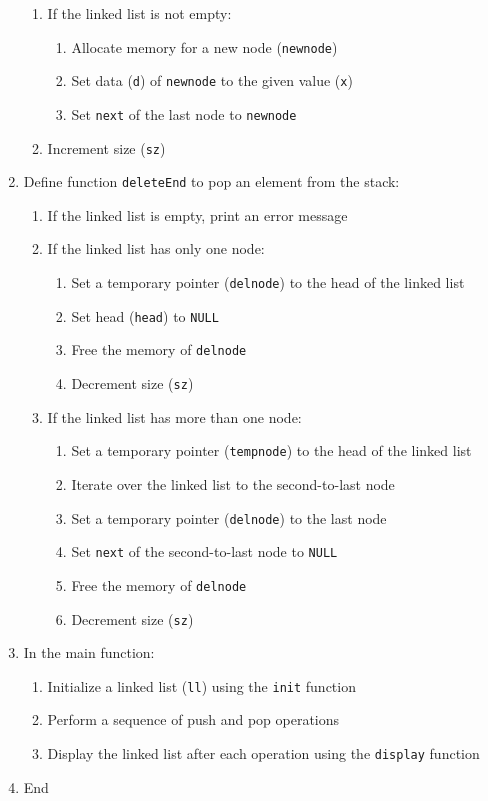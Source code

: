 \documentclass{article}
\begin{document}
\begin{enumerate}
\begin{enumerate}
      \item If the linked list is not empty:
        \begin{enumerate}
          \item Allocate memory for a new node (\texttt{newnode})
          \item Set data (\texttt{d}) of \texttt{newnode} to the given value (\texttt{x})
          \item Set \texttt{next} of the last node to \texttt{newnode}
        \end{enumerate}
      \item Increment size (\texttt{sz})
    \end{enumerate}
  \item Define function \texttt{deleteEnd} to pop an element from the stack:
    \begin{enumerate}
      \item If the linked list is empty, print an error message
      \item If the linked list has only one node:
        \begin{enumerate}
          \item Set a temporary pointer (\texttt{delnode}) to the head of the linked list
          \item Set head (\texttt{head}) to \texttt{NULL}
          \item Free the memory of \texttt{delnode}
          \item Decrement size (\texttt{sz})
        \end{enumerate}
      \item If the linked list has more than one node:
        \begin{enumerate}
          \item Set a temporary pointer (\texttt{tempnode}) to the head of the linked list
          \item Iterate over the linked list to the second-to-last node
          \item Set a temporary pointer (\texttt{delnode}) to the last node
          \item Set \texttt{next} of the second-to-last node to \texttt{NULL}
          \item Free the memory of \texttt{delnode}
          \item Decrement size (\texttt{sz})
        \end{enumerate}
    \end{enumerate}
  \item In the main function:
    \begin{enumerate}
      \item Initialize a linked list (\texttt{ll}) using the \texttt{init} function
      \item Perform a sequence of push and pop operations
      \item Display the linked list after each operation using the \texttt{display} function
    \end{enumerate}
  \item End
\end{enumerate}
\end{document}
